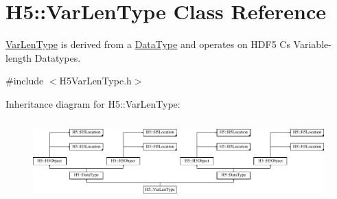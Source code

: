 \hypertarget{class_h5_1_1_var_len_type}{}\section{H5\+:\+:Var\+Len\+Type Class Reference}
\label{class_h5_1_1_var_len_type}


\hyperlink{class_h5_1_1_var_len_type}{Var\+Len\+Type} is derived from a \hyperlink{class_h5_1_1_data_type}{Data\+Type} and operates on H\+D\+F5 C\textquotesingle{}s Variable-\/length Datatypes.  




{\ttfamily \#include $<$H5\+Var\+Len\+Type.\+h$>$}

Inheritance diagram for H5\+:\+:Var\+Len\+Type\+:\begin{figure}[H]
\begin{center}
\leavevmode
\includegraphics[height=3.125000cm]{class_h5_1_1_var_len_type}
\end{center}
\end{figure}
